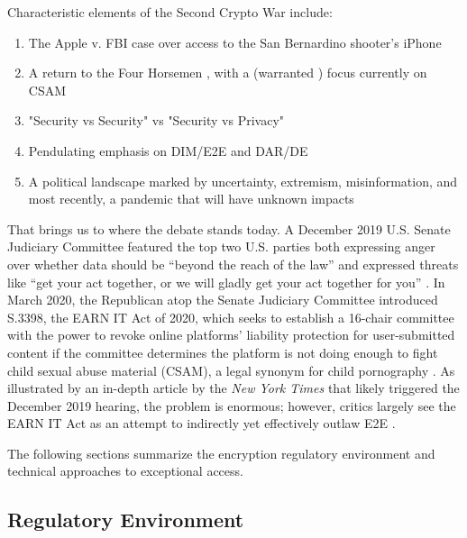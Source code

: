 Characteristic elements of the Second Crypto War include:
\begin{enumerate}
    \item The Apple v. FBI case over access to the San Bernardino shooter's iPhone \cite{schulze_clipper_2017}
    \item A return to the Four Horsemen \cite{schneier_scaring_2019}, with a (warranted \cite{keller_internet_2019})
            focus currently on CSAM \cite{geller_2019}
    \item "Security vs Security" vs "Security vs Privacy" \cite{stalla_bourdillon_privacy_2014} \cite{schneier_2019}
    \item Pendulating emphasis on DIM/E2E and DAR/DE \cite{schneier_2019}
    \item A political landscape marked by uncertainty, extremism, misinformation, and most recently, a pandemic that
            will have unknown impacts
\end{enumerate}

That brings us to where the debate stands today. A December 2019 U.S. Senate Judiciary Committee featured the top two
U.S. parties both expressing anger over whether data should be ``beyond the reach of the law'' and expressed threats
like ``get your act together, or we will gladly get your act together for you'' \cite{geller_2019}. In March 2020, the
Republican atop the Senate Judiciary Committee introduced S.3398, the EARN IT Act of 2020, which seeks to establish a
16-chair committee with the power to revoke online platforms' liability protection for user-submitted content if the
committee determines the platform is not doing enough to fight child sexual abuse material (CSAM), a legal synonym for
child pornography \cite{graham_s3398_2020}. As illustrated by an in-depth article by the \textit{New York Times}
\cite{keller_internet_2019} that likely triggered the December 2019 hearing, the problem is enormous; however, critics
largely see the EARN IT Act as an attempt to indirectly yet effectively outlaw E2E \cite{newman_2020}
\cite{pfefferkorn_2020}.


The following sections summarize the encryption regulatory environment and technical approaches to exceptional access.

\subsection{Regulatory Environment}
\label{sec-reg-environment}

